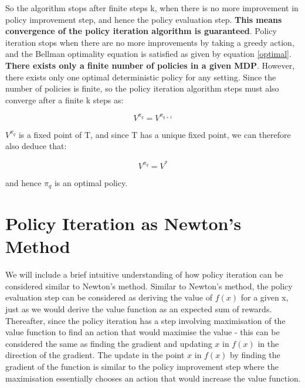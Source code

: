 \documentclass{article}\usepackage[]{graphicx}\usepackage[]{color}
\let\Oldsection\section
\renewcommand{\section}{\FloatBarrier\Oldsection}
\theoremstyle{plain}
\begin{document}
\noindent
So the algorithm stops after finite steps k, when there is no more improvement in policy improvement step, and hence the policy evaluation step. 
\noindent
\textbf{This means convergence of the policy iteration algorithm is guaranteed}. Policy iteration stops when there are no more improvements by taking a greedy action, and the Bellman optimality equation is satisfied as given by equation \ref{optimal}.\\


\noindent
\textbf{There exists only a finite number of policies in a given MDP}. However, there exists only one optimal deterministic policy for any setting. Since the number of policies is finite, so the policy iteration algorithm steps must also converge after a finite k steps as:

\begin{equation}
    V^{\pi_{q}} = V^{\pi_{q+1}}
\end{equation}


\noindent
$V^{\pi_{q}}$ is a fixed point of T, and since T has a unique fixed point, we can therefore also deduce that:

\begin{equation}
    V^{\pi_q} = V^{*} 
\end{equation}

\noindent
and hence $\pi_q$ is an optimal policy. 
















\section{Policy Iteration as Newton's Method}

\noindent
We will include a brief intuitive understanding of how policy iteration can be considered similar to Newton's method. Similar to Newton's method, the policy evaluation step can be considered as deriving the value of $f(x)$ for a given x, just as we would derive the value function as an expected sum of rewards. Thereafter, since the policy iteration has a step involving maximisation of the value function to find an action that would maximise the value - this can be considered the same as finding the gradient and updating $x$ in $f(x)$ in the direction of the gradient. The update in the point $x$ in $f(x)$ by finding the gradient of the function is similar to the policy improvement step where the maximisation essentially chooses an action that would increase the value function.\\
\end{document}
